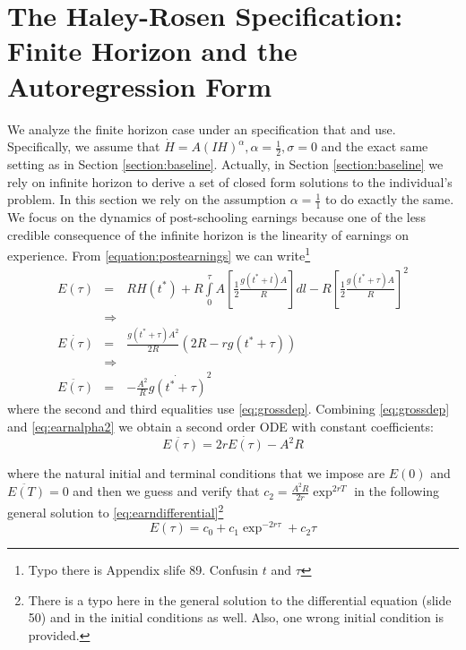 \section{The Haley-Rosen Specification: Finite Horizon and the Autoregression Form}
We analyze the finite horizon case under an specification that \citet{haley1976estimation} and \citet{rosen1976theory} use. Specifically, we assume that $\dot{H} = A \left( IH \right)^{\alpha}, \alpha = \frac{1}{2}, \sigma = 0$ and the exact same setting as in Section \ref{section:baseline}. Actually, in Section \ref{section:baseline} we rely on infinite horizon to derive a set of closed form solutions to the individual's problem. In this section we rely on the assumption $\alpha = \frac{1}{1}$ to do exactly the same.\\
\indent We focus on the dynamics of post-schooling earnings because one of the less credible consequence of the infinite horizon is the linearity of earnings on experience. From \eqref{equation:postearnings} we can write\footnote{Typo there is Appendix slife 89. Confusin $t$ and $\tau$}
\begin{eqnarray}
E(\tau) &=& RH(t^*) + R \int \limits _{0} ^{\tau} A \left[\frac{1}{2} \frac{g(t^* + l)A}{R} \right]dl - R \left[\frac{1}{2} \frac{g(t^* + \tau)A}{R} \right]^{2} \nonumber \\
&\Rightarrow& \nonumber \\
\dot{E(\tau)} &=& \frac{g (t^* + \tau)A^2}{2R}\left( 2R -rg (t^* + \tau) \right) \nonumber \\
&\Rightarrow& \nonumber \\
\ddot{E(\tau)} &=& -\frac{A^2}{R}\dot{g(t^* + \tau)}^2 \label{eq:earnalpha2}
\end{eqnarray}
where the second and third equalities use \eqref{eq:grossdep}. Combining \eqref{eq:grossdep} and \eqref{eq:earnalpha2} we obtain a second order ODE with constant coefficients:
\begin{equation}
\ddot{E(\tau)} = 2r \dot{E(\tau)} - A^2 R \label{eq:earndifferential}
\end{equation} 

\noindent where the natural initial and terminal conditions that we impose are $E(0)$ and $\ddot{E(T)} = 0$ and then we guess and verify that $c_{2} = \frac{A^2 R}{2r}\exp^{2rT}$ in the following general solution to \eqref{eq:earndifferential}\footnote{There is a typo here in the general solution to the differential equation (slide 50) and in the initial conditions as well. Also, one wrong initial condition is provided.}
\begin{equation}
E(\tau) = c_{0} + c_{1}\exp^{-2r \tau} + c_{2} \tau
\end{equation}

